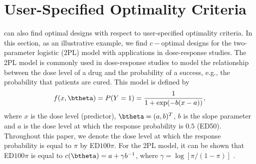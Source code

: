 \section{User-Specified Optimality Criteria}
\label{sec:new-optimality}
 can also find optimal designs with respect to  user-specified optimality criteria.   In this section, as an illustrative example, we  find $c-$optimal designs for  the two-parameter logistic (2PL) model with applications in dose-response studies.
The 2PL model is commonly used in dose-response studies   to  model the relationship between the dose level of a drug and the probability of  a success, e.g.,  the probability that patients are cured. This model is defined by
\begin{equation}
\label{eq:logistic-model}
f(x, \btheta) = P(Y=1) =  \frac{1}{1 + \exp(-b(x-a))},
\end{equation}
where  $x$ is the dose level (predictor), $\btheta = (a, b)^T$,  $b$ is the slope parameter  and $a$ is the dose level at which the response probability is $0.5$ (ED50).  Throughout this paper, we denote the   dose level at which the response probability is equal to $\pi$ by ED$100\pi$.
For the 2PL model, it can be shown that ED$100\pi$  is equal to  $c(\btheta) = a + \gamma b^{-1}$, where $\gamma = \log[\pi/(1-\pi)]$ \citep[see, e.g.,][]{zhu2001bayesian}. 

  
